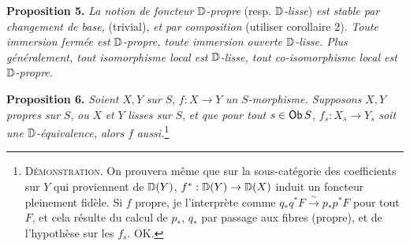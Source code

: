 \noindent\textbf{Proposition 5.} \textit{La notion de foncteur} $\mathbb{D}$\textit{-propre} (resp. $\mathbb{D}$\textit{-lisse}) \textit{est stable par changement de base,} (trivial), \textit{et par composition} (utiliser corollaire 2). \textit{Toute immersion fermée est} $\mathbb{D}$\textit{-propre, toute immersion ouverte} $\mathbb{D}$\textit{-lisse. Plus généralement, tout isomorphisme local est} $\mathbb{D}$\textit{-lisse, tout co-isomorphisme local est} $\mathbb{D}$\textit{-propre.}

\noindent\textbf{Proposition 6.} \textit{Soient} $X, Y$ \textit{sur} $S$, $f : X \to Y$ \textit{un} $S$\textit{-morphisme. Supposons} $X, Y$ \textit{propres sur} $S$, \textit{ou} $X$ \textit{et} $Y$ \textit{lisses sur} $S$, \textit{et que pour tout} $s \in \mathsf{Ob}\, S$, $f_s : X_s \to Y_s$ \textit{soit une} $\mathbb{D}$\textit{-équivalence, alors} $f$ \textit{aussi.}\footnote[32]{\textsc{Démonstration}. On prouvera même que sur la sous-catégorie des coefficients sur $Y$ qui proviennent de $\mathbb{D}(Y)$, $f^* : \mathbb{D}(Y) \to \mathbb{D}(X)$ induit un foncteur pleinement fidèle. Si $f$ propre, je l'interprète comme $q_*q^*F \overset{\sim}{\to} p_*p^*F$ pour tout $F$, et cela résulte du calcul de $p_*$, $q_*$ par passage aux fibres (propre), et de l'hypothèse sur les $f_s$. OK.}

